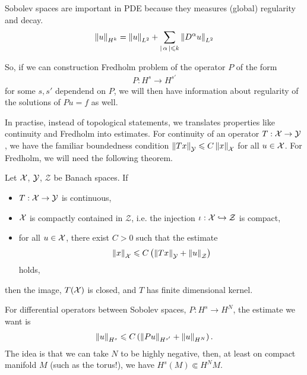 \documentclass{article}
\begin{document}
Sobolev spaces are important in PDE because they measures (global) regularity and decay. 
\begin{align*}
\norm[u]_{H^k} = \norm[u]_{L^2} + \sum_{\abs{\alpha} \leq k} \norm[D^\alpha u ]_{L^2} 
\end{align*}

So, if we can construction Fredholm problem of the operator $P$ of the form
\begin{align*}
P : H^{s} \to H^{s'}
\end{align*}
for some $s, s'$ dependend on $P$, we will then have information about regularity of the solutions of $Pu = f$ as well. 


In practise, instead of topological statements, we translates properties like continuity and Fredholm into estimates. For continuity of an operator $T : \X \to \Y$, we have the familiar boundedness condition $\norm[Tx]_{\Y} \leq C \norm[x]_{\X}$ for all $u \in \X$. For Fredholm, we will need the following theorem. 
\begin{theorem} \label{theorem: fredholm estimates}
    Let $\X$, $\Y$, $\mathcal{Z}$ be Banach spaces.  If 
    \begin{itemize}
        \item $T : \X \to \Y$ is continuous, 
        \item $\X$ is compactly contained in $\mathcal{Z}$, i.e. the injection $\iota : \X\hookrightarrow \mathcal{Z}$ is compact, 
        \item for all $u \in \X$, there exist $C > 0$ such that the estimate 
        \begin{align*}
        \norm[x]_\X \leq C \brac{\norm[Tx]_\Y + \norm[u]_\mathcal{Z}}
        \end{align*}
        holds, 
    \end{itemize}
     then the image, $T(\X)$ is closed, and $T$ has finite dimensional kernel. 
\end{theorem}

For differential operators between Sobolev spaces, $P : H^s \to H^N$,  the estimate we want is 
\begin{align*}
\norm[u]_{H^s} \leq C \brac{\norm[Pu]_{H^{s'}} + \norm[u]_{H^{N}}}. 
\end{align*}
The idea is that we can take $N$ to be highly negative, then, at least on compact manifold $M$ (such as the torus!), we have $H^s(M) \Subset H^N{M}$. 
\end{document}
